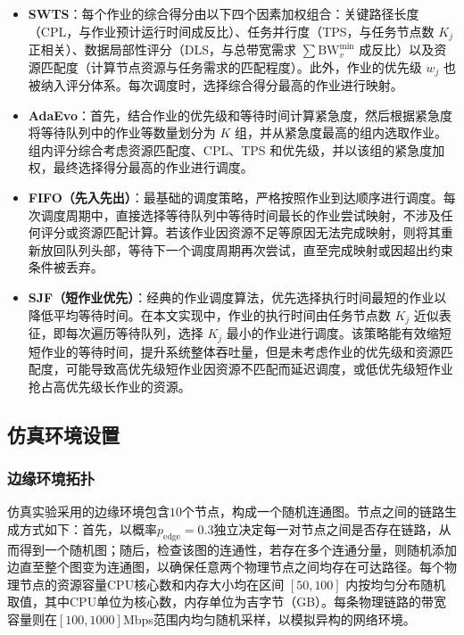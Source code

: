 \begin{itemize}
    \item \textbf{SWTS}\cite{SWTS}：每个作业的综合得分由以下四个因素加权组合：关键路径长度（CPL，与作业预计运行时间成反比）、任务并行度（TPS，与任务节点数 $K_j$ 正相关）、数据局部性评分（DLS，与总带宽需求 $\sum \text{BW}_v^{\min}$ 成反比）以及资源匹配度（计算节点资源与任务需求的匹配程度）。此外，作业的优先级 $w_j$ 也被纳入评分体系。每次调度时，选择综合得分最高的作业进行映射。

    \item \textbf{AdaEvo}\cite{AdaEvo}：首先，结合作业的优先级和等待时间计算紧急度，然后根据紧急度将等待队列中的作业等数量划分为 $K$ 组，并从紧急度最高的组内选取作业。组内评分综合考虑资源匹配度、CPL、TPS 和优先级，并以该组的紧急度加权，最终选择得分最高的作业进行调度。
    
    \item \textbf{FIFO（先入先出）}：最基础的调度策略，严格按照作业到达顺序进行调度。每次调度周期中，直接选择等待队列中等待时间最长的作业尝试映射，不涉及任何评分或资源匹配计算。若该作业因资源不足等原因无法完成映射，则将其重新放回队列头部，等待下一个调度周期再次尝试，直至完成映射或因超出约束条件被丢弃。

    \item \textbf{SJF（短作业优先）}：经典的作业调度算法，优先选择执行时间最短的作业以降低平均等待时间。在本文实现中，作业的执行时间由任务节点数 $K_j$ 近似表征，即每次遍历等待队列，选择 $K_j$ 最小的作业进行调度。该策略能有效缩短短作业的等待时间，提升系统整体吞吐量，但是未考虑作业的优先级和资源匹配度，可能导致高优先级短作业因资源不匹配而延迟调度，或低优先级短作业抢占高优先级长作业的资源。
\end{itemize}

\subsection{仿真环境设置}
\subsubsection{边缘环境拓扑}
仿真实验采用的边缘环境包含$10$个节点，构成一个随机连通图。节点之间的链路生成方式如下：首先，以概率$p_{\text{edge}}=0.3$独立决定每一对节点之间是否存在链路，从而得到一个随机图；随后，检查该图的连通性，若存在多个连通分量，则随机添加边直至整个图变为连通图，以确保任意两个物理节点之间均存在可达路径。每个物理节点的资源容量CPU核心数和内存大小均在区间 $[50,100]$ 内按均匀分布随机取值，其中CPU单位为核心数，内存单位为吉字节（GB）。每条物理链路的带宽容量则在$[100,1000]$Mbps范围内均匀随机采样，以模拟异构的网络环境。

